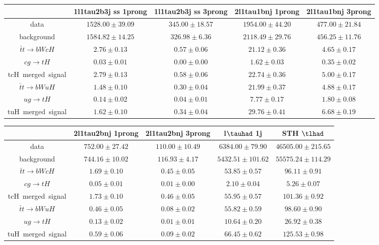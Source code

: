 \begin{tabular}{|c|c|c|c|c|} \hline
 & 1l1tau2b3j ss 1prong   & 1l1tau2b3j ss 3prong   & 2l1tau1bnj 1prong   & 2l1tau1bnj 3prong  \\\hline
data & $1528.00\pm39.09$ & $345.00\pm18.57$ & $1954.00\pm44.20$ & $477.00\pm21.84$\\\hline
background & $1584.82\pm14.25$ & $326.98\pm6.36$ & $2118.49\pm29.76$ & $456.25\pm11.76$\\\hline
$\bar{t}t\to bWcH$ & $2.76\pm0.13$ & $0.57\pm0.06$ & $21.12\pm0.36$ & $4.65\pm0.17$\\\hline
$cg\to tH$ & $0.03\pm0.01$ & $0.00\pm0.00$ & $1.62\pm0.03$ & $0.35\pm0.02$\\\hline
tcH~merged~signal & $2.79\pm0.13$ & $0.58\pm0.06$ & $22.74\pm0.36$ & $5.00\pm0.17$\\\hline
$\bar{t}t\to bWuH$ & $1.48\pm0.10$ & $0.30\pm0.04$ & $21.99\pm0.37$ & $4.88\pm0.17$\\\hline
$ug\to tH$ & $0.14\pm0.02$ & $0.04\pm0.01$ & $7.77\pm0.17$ & $1.80\pm0.08$\\\hline
tuH~merged~signal & $1.62\pm0.10$ & $0.34\pm0.04$ & $29.76\pm0.41$ & $6.68\pm0.19$\\\hline
\end{tabular}
\begin{tabular}{|c|c|c|c|c|} \hline
 & 2l1tau2bnj 1prong   & 2l1tau2bnj 3prong   & l$\tauhad$ 1j   & STH $\tlhad$   \\\hline
data & $752.00\pm27.42$ & $110.00\pm10.49$ & $6384.00\pm79.90$ & $46505.00\pm215.65$\\\hline
background & $744.16\pm10.02$ & $116.93\pm4.17$ & $5432.51\pm101.62$ & $55575.24\pm114.29$\\\hline
$\bar{t}t\to bWcH$ & $1.69\pm0.10$ & $0.45\pm0.05$ & $53.85\pm0.57$ & $96.11\pm0.91$\\\hline
$cg\to tH$ & $0.05\pm0.01$ & $0.01\pm0.00$ & $2.10\pm0.04$ & $5.26\pm0.07$\\\hline
tcH~merged~signal & $1.73\pm0.10$ & $0.46\pm0.05$ & $55.95\pm0.57$ & $101.36\pm0.92$\\\hline
$\bar{t}t\to bWuH$ & $0.46\pm0.05$ & $0.08\pm0.02$ & $55.82\pm0.59$ & $98.60\pm0.90$\\\hline
$ug\to tH$ & $0.13\pm0.02$ & $0.01\pm0.01$ & $10.64\pm0.20$ & $26.92\pm0.38$\\\hline
tuH~merged~signal & $0.59\pm0.06$ & $0.09\pm0.02$ & $66.45\pm0.62$ & $125.53\pm0.98$\\\hline
\end{tabular}

